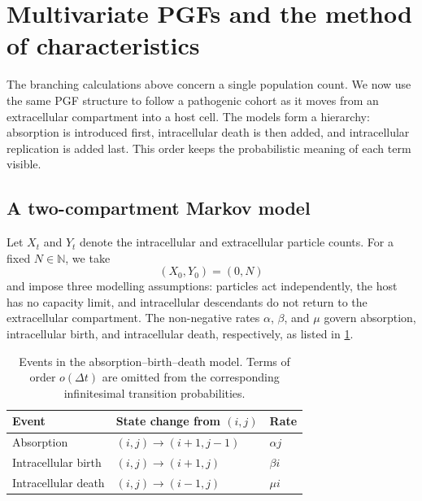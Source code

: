 \section{Multivariate PGFs and the method of characteristics}
\label{sec:multivariate-pgf}

The branching calculations above concern a single population count.  We now use the same PGF structure to follow a pathogenic cohort as it moves from an extracellular compartment into a host cell.  The models form a hierarchy: absorption is introduced first, intracellular death is then added, and intracellular replication is added last.  This order keeps the probabilistic meaning of each term visible.

\subsection{A two-compartment Markov model}
\label{sec:two-compartment-model}

Let $X_t$ and $Y_t$ denote the intracellular and extracellular particle counts.  For a fixed $N\in\mathbb{N}$, we take
\[
  (X_0,Y_0)=(0,N)
\]
and impose three modelling assumptions: particles act independently, the host has no capacity limit, and intracellular descendants do not return to the extracellular compartment.  The non-negative rates $\alpha$, $\beta$, and $\mu$ govern absorption, intracellular birth, and intracellular death, respectively, as listed in \cref{tab:compartment-events}.

\begin{table}[tb]
  \centering
  \caption{Events in the absorption--birth--death model.  Terms of order $o(\Delta t)$ are omitted from the corresponding infinitesimal transition probabilities.}
  \label{tab:compartment-events}
  \begin{tabular}{@{}lll@{}}
    \toprule
    Event & State change from $(i,j)$ & Rate \\
    \midrule
    Absorption          & $(i,j)\to(i+1,j-1)$ & $\alpha j$ \\
    Intracellular birth & $(i,j)\to(i+1,j)$   & $\beta i$ \\
    Intracellular death & $(i,j)\to(i-1,j)$   & $\mu i$ \\
    \bottomrule
  \end{tabular}
\end{table}

